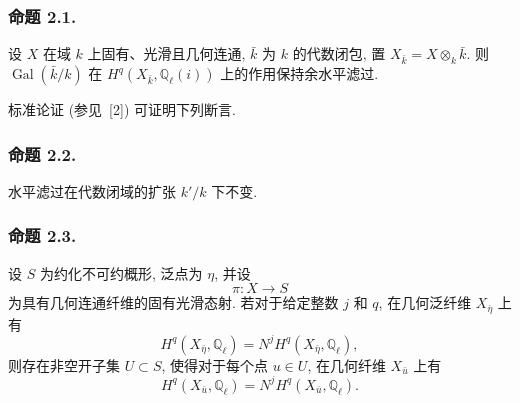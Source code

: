 \subsubsection*{命题 2.1.}
设 $X$ 在域 $k$ 上固有、光滑且几何连通, $\bar k$ 为 $k$ 的代数闭包, 置 $X_{\bar k}=X\otimes_k\bar k$. 则 $\operatorname{Gal}(\bar k/k)$ 在 $H^q(X_{\bar k},\mathbb Q_\ell(i))$ 上的作用保持余水平滤过.

标准论证 (参见~[2]) 可证明下列断言.

\subsubsection*{命题 2.2.}
水平滤过在代数闭域的扩张 $k'/k$ 下不变.

\subsubsection*{命题 2.3.}
设 $S$ 为约化不可约概形, 泛点为 $\eta$, 并设
\begin{equation*}
\pi:X\longrightarrow S
\end{equation*}
为具有几何连通纤维的固有光滑态射. 若对于给定整数 $j$ 和 $q$, 在几何泛纤维 $X_{\bar\eta}$ 上有
\begin{equation}\tag{2.3.1}
H^q(X_{\bar\eta},\mathbb Q_\ell)
=N^jH^q(X_{\bar\eta},\mathbb Q_\ell),
\end{equation}
则存在非空开子集 $U\subset S$, 使得对于每个点 $u\in U$, 在几何纤维 $X_{\bar u}$ 上有
\begin{equation}\tag{2.3.2}
H^q(X_{\bar u},\mathbb Q_\ell)
=N^jH^q(X_{\bar u},\mathbb Q_\ell).
\end{equation}

